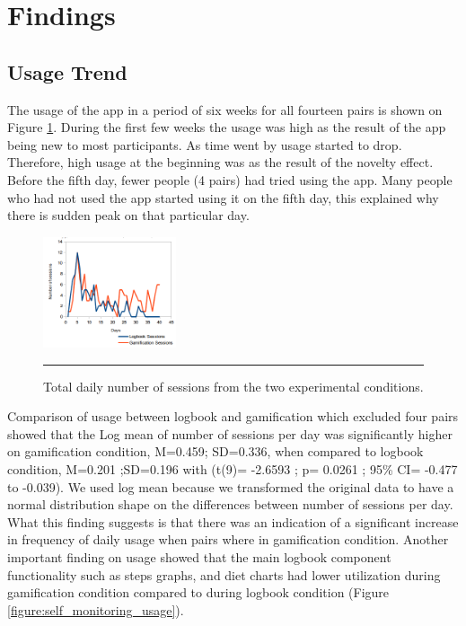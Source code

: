 \documentclass{sig-alternate}
\begin{document}
\section{Findings}
\subsection{Usage Trend} 
The usage of the app in a period of six weeks for all fourteen pairs is shown on Figure \ref{figure:usagedailysessions}. During the first few weeks the usage was high as the result of the app being new to most participants. As time went by usage started to drop. Therefore, high usage at the beginning was as the result of the novelty effect.  Before the fifth day, fewer people (4 pairs) had tried using the app. Many people who had not used the app started using it on the fifth day, this explained why there is sudden peak on that particular day.
\begin{figure}[htbp]
  \centering
    \includegraphics[width=0.35\textwidth]{scatter_daily_sessions.png}
    \rule{26em}{0.5pt}
  \caption{Total daily number of sessions from the two experimental conditions.}
  \label{figure:usagedailysessions}
\end{figure} 
Comparison of usage between logbook and gamification which excluded four pairs showed that the Log mean of number of sessions per day was significantly higher on gamification condition, M=0.459; SD=0.336, when compared to logbook condition, M=0.201 ;SD=0.196 with (t(9)= -2.6593 ; p= 0.0261 ; 95\% CI=  -0.477 to -0.039). We used log mean because we transformed the original data to have a normal distribution shape on the differences between number of sessions per day. What this finding suggests is that there was an indication of a significant increase in frequency of daily usage when pairs where in gamification condition.\newline
Another important finding on usage showed that the main logbook component functionality such as steps graphs, and diet charts had lower utilization during gamification condition compared to during logbook condition (Figure \ref{figure:self_monitoring_usage}).
\end{document}
